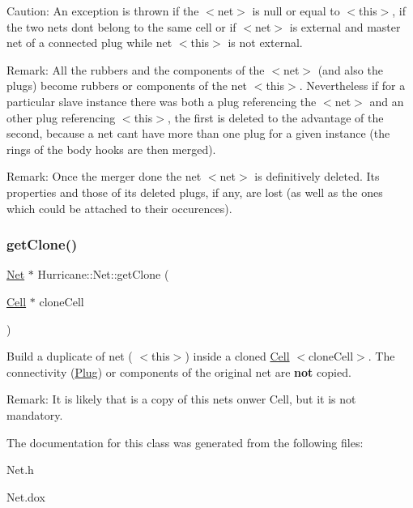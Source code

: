 \begin{DoxyParagraph}{Caution\+: An exception is thrown if the {\ttfamily $<$net$>$} is null or equal to }
{\ttfamily $<$this$>$}, if the two nets don\textquotesingle{}t belong to the same cell or if {\ttfamily $<$net$>$} is external and master net of a connected plug while net {\ttfamily $<$this$>$} is not external.
\end{DoxyParagraph}
\begin{DoxyParagraph}{Remark\+: All the rubbers and the components of the {\ttfamily $<$net$>$} (and }
also the plugs) become rubbers or components of the net {\ttfamily $<$this$>$}. Nevertheless if for a particular slave instance there was both a plug referencing the {\ttfamily $<$net$>$} and an other plug referencing {\ttfamily $<$this$>$}, the first is deleted to the advantage of the second, because a net can\textquotesingle{}t have more than one plug for a given instance (the rings of the body hooks are then merged).
\end{DoxyParagraph}
\begin{DoxyParagraph}{Remark\+: Once the merger done the net {\ttfamily $<$net$>$} is definitively }
deleted. Its properties and those of its deleted plugs, if any, are lost (as well as the ones which could be attached to their occurences). 
\end{DoxyParagraph}
\mbox{\label{classHurricane_1_1Net_a4bd27e6ae22606463491c28437c4068f}} 
\subsubsection{\texorpdfstring{get\+Clone()}{getClone()}}
{\footnotesize\ttfamily \mbox{\hyperlink{classHurricane_1_1Net}{Net}} $\ast$ Hurricane\+::\+Net\+::get\+Clone (\begin{DoxyParamCaption}\item[{\mbox{\hyperlink{classHurricane_1_1Cell}{Cell}} $\ast$}]{clone\+Cell }\end{DoxyParamCaption})}

Build a duplicate of net ({\ttfamily } $<$this$>$) inside a cloned \mbox{\hyperlink{classHurricane_1_1Cell}{Cell}} {\ttfamily } $<$clone\+Cell$>$. The connectivity (\mbox{\hyperlink{classHurricane_1_1Plug}{Plug}}) or components of the original net are {\bfseries not} copied.

\begin{DoxyParagraph}{Remark\+: It is likely that {\ttfamily } is a copy of this net\textquotesingle{}s onwer Cell,}
but it is not mandatory. 
\end{DoxyParagraph}


The documentation for this class was generated from the following files\+:\begin{DoxyCompactItemize}
\item 
Net.\+h\item 
Net.\+dox\end{DoxyCompactItemize}
